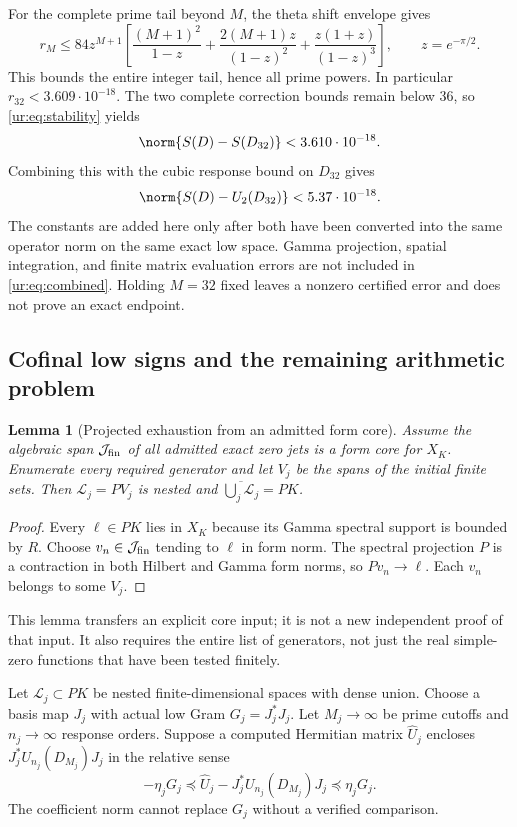 \documentclass[11pt,a4paper]{article}
\numberwithin{equation}{section}
\newtheorem{lemma}[theorem]{Lemma}
\theoremstyle{definition}\newtheorem{definition}[theorem]{Definition}
\theoremstyle{remark}\newtheorem{remark}[theorem]{Remark}
\begin{document}
For the complete prime tail beyond $M$, the theta shift envelope gives
\[
 r_M\le84z^{M+1}\left[
 \frac{(M+1)^2}{1-z}+\frac{2(M+1)z}{(1-z)^2}
                     +\frac{z(1+z)}{(1-z)^3}\right],\qquad z=e^{-\pi/2}.
\]
This bounds the entire integer tail, hence all prime powers. In
particular $r_{32}<3.609\cdot10^{-18}$. The two complete correction
bounds remain below $36$, so \eqref{ur:eq:stability} yields
\[
 \norm{S(D)-S(D_{32})}<3.610\cdot10^{-18}.
\]
Combining this with the cubic response bound on $D_{32}$ gives
\begin{equation}\label{ur:eq:combined}
 \norm{S(D)-U_2(D_{32})}<5.37\cdot10^{-18}.
\end{equation}
The constants are added here only after both have been converted into
the same operator norm on the same exact low space. Gamma projection,
spatial integration, and finite matrix evaluation errors are not
included in \eqref{ur:eq:combined}. Holding $M=32$ fixed leaves a nonzero
certified error and does not prove an exact endpoint.

\subsection{Cofinal low signs and the remaining arithmetic problem}
\begin{lemma}[Projected exhaustion from an admitted form core]\label{ur:lem:core}
Assume the algebraic span $\mathcal J_{\rm fin}$ of all admitted exact
zero jets is a form core for ${X}_K$. Enumerate every required generator
and let $V_j$ be the spans of the initial finite sets. Then
${\mathcal L}_j=PV_j$ is nested and $\overline{\bigcup_j{\mathcal L}_j}=PK$.
\end{lemma}
\begin{proof}
Every $\ell\in PK$ lies in ${X}_K$ because its Gamma spectral support
is bounded by $R$. Choose $v_n\in\mathcal J_{\rm fin}$ tending to
$\ell$ in form norm. The spectral projection $P$ is a contraction in
both Hilbert and Gamma form norms, so $Pv_n\to\ell$. Each $v_n$
belongs to some $V_j$.
\end{proof}
This lemma transfers an explicit core input; it is not a new independent
proof of that input. It also requires the entire list of generators,
not just the real simple-zero functions that have been tested finitely.

Let ${\mathcal L}_j\subset PK$ be nested finite-dimensional spaces with dense
union. Choose a basis map $J_j$ with actual low Gram $G_j=J_j^*J_j$.
Let $M_j\to\infty$ be prime cutoffs and $n_j\to\infty$ response orders.
Suppose a computed Hermitian matrix $\widehat U_j$ encloses
$J_j^*U_{n_j}(D_{M_j})J_j$ in the relative sense
\[
 -\eta_jG_j\preceq
 \widehat U_j-J_j^*U_{n_j}(D_{M_j})J_j
 \preceq\eta_jG_j.
\]
The coefficient norm cannot replace $G_j$ without a verified comparison.
\end{document}
